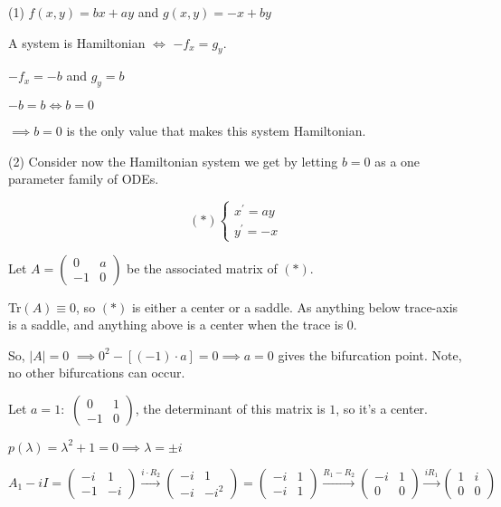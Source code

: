 \documentclass{article}
\begin{document}
(1) $f(x,y) = bx + ay$ and $g(x,y) = -x +by$

A system is Hamiltonian $\iff$ $-f_x = g_y$.

$-f_x = -b$ and $g_y= b$

$-b = b \iff b = 0$

$\implies b = 0$ is the only value that makes this system Hamiltonian.

(2) Consider now the Hamiltonian system we get by letting $b = 0$ as a
one parameter family of ODEs.

\[(*)
  \begin{cases}
    x^\prime = ay \\
    y^\prime = -x
\end{cases}\]

Let $A = \begin{pmatrix}0&a\\-1&0\end{pmatrix}$ be the associated
matrix of $(*)$.

\newpage

Tr$(A) \equiv 0$, so $(*)$ is either a center or a saddle. As anything below trace-axis
is a saddle, and anything above is a center when the trace is $0$.

So, $|A| = 0$ $\implies 0^2-[(-1)\cdot a] = 0 \implies a = 0$ gives
the bifurcation point. Note, no other bifurcations can occur.

Let $a = 1:$  $\begin{pmatrix}0&1\\-1&0\end{pmatrix}$, the determinant
of this matrix is $1$, so it's a center.

$p(\lambda) = \lambda^2+1 = 0 \implies \lambda = \pm i$

$A_{1} - iI = \begin{pmatrix}-i&1\\-1&-i\end{pmatrix}
\stackrel{i\cdot R_2}{\rightarrow}
\begin{pmatrix} -i&1\\
  -i&-i^2\end{pmatrix}
=
\begin{pmatrix}
  -i&1\\
  -i&1
\end{pmatrix}
\stackrel{R_1- R_2}{\rightarrow}
\begin{pmatrix} -i&1\\
  0&0\end{pmatrix}
\stackrel{iR_1}{\rightarrow}
\begin{pmatrix} 1&i\\
  0&0\end{pmatrix}$
\end{document}
